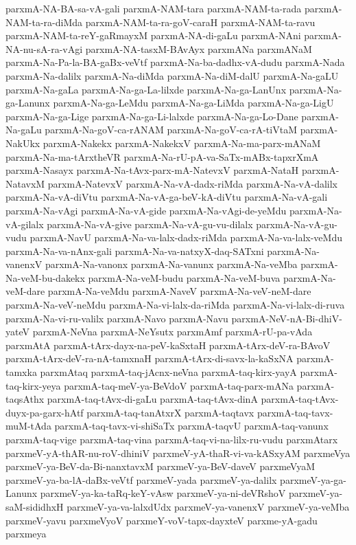{parxmA-NA-BA-sa-vA-gali
parxmA-NAM-tara
parxmA-NAM-ta-rada
parxmA-NAM-ta-ra-diMda
parxmA-NAM-ta-ra-goV-caraH
parxmA-NAM-ta-ravu
parxmA-NAM-ta-reY-gaRmayxM
parxmA-NA-di-gaLu
parxmA-NAni
parxmA-NA-nu-sA-ra-vAgi
parxmA-NA-tasxM-BAvAyx
parxmANa
parxmANaM
parxmA-Na-Pa-la-BA-gaBx-veVtf
parxmA-Na-ba-dadhx-vA-dudu
parxmA-Nada
parxmA-Na-dalilx
parxmA-Na-diMda
parxmA-Na-diM-dalU
parxmA-Na-gaLU
parxmA-Na-gaLa
parxmA-Na-ga-La-lilxde
parxmA-Na-ga-LanUnx
parxmA-Na-ga-Lanunx
parxmA-Na-ga-LeMdu
parxmA-Na-ga-LiMda
parxmA-Na-ga-LigU
parxmA-Na-ga-Lige
parxmA-Na-ga-Li-lalxde
parxmA-Na-ga-Lo-Dane
parxmA-Na-gaLu
parxmA-Na-goV-ca-rANAM
parxmA-Na-goV-ca-rA-tiVtaM
parxmA-NakUkx
parxmA-Nakekx
parxmA-NakekxV
parxmA-Na-ma-parx-mANaM
parxmA-Na-ma-tArxtheVR
parxmA-Na-rU-pA-va-SaTx-mABx-tapxrXmA
parxmA-Nasayx
parxmA-Na-tAvx-parx-mA-NatevxV
parxmA-NataH
parxmA-NatavxM
parxmA-NatevxV
parxmA-Na-vA-dadx-riMda
parxmA-Na-vA-dalilx
parxmA-Na-vA-diVtu
parxmA-Na-vA-ga-beV-kA-diVtu
parxmA-Na-vA-gali
parxmA-Na-vAgi
parxmA-Na-vA-gide
parxmA-Na-vAgi-de-yeMdu
parxmA-Na-vA-gilalx
parxmA-Na-vA-give
parxmA-Na-vA-gu-vu-dilalx
parxmA-Na-vA-gu-vudu
parxmA-NavU
parxmA-Na-va-lalx-dadx-riMda
parxmA-Na-va-lalx-veMdu
parxmA-Na-va-nAnx-gali
parxmA-Na-va-natxyX-daq-SATxni
parxmA-Na-vanenxV
parxmA-Na-vanonx
parxmA-Na-vanunx
parxmA-Na-veMba
parxmA-Na-veM-bu-dakekx
parxmA-Na-veM-budu
parxmA-Na-veM-buva
parxmA-Na-veM-dare
parxmA-Na-veMdu
parxmA-NaveV
parxmA-Na-veV-neM-dare
parxmA-Na-veV-neMdu
parxmA-Na-vi-lalx-da-riMda
parxmA-Na-vi-lalx-di-ruva
parxmA-Na-vi-ru-valilx
parxmA-Navo
parxmA-Navu
parxmA-NeV-nA-Bi-dhiV-yateV
parxmA-NeVna
parxmA-NeYsutx
parxmAmf
parxmA-rU-pa-vAda
parxmAtA
parxmA-tArx-dayx-na-peV-kaSxtaH
parxmA-tArx-deV-ra-BAvoV
parxmA-tArx-deV-ra-nA-tamxnaH
parxmA-tArx-di-savx-la-kaSxNA
parxmA-tamxka
parxmAtaq
parxmA-taq-jAcnx-neVna
parxmA-taq-kirx-yayA
parxmA-taq-kirx-yeya
parxmA-taq-meV-ya-BeVdoV
parxmA-taq-parx-mANa
parxmA-taqsAthx
parxmA-taq-tAvx-di-gaLu
parxmA-taq-tAvx-dinA
parxmA-taq-tAvx-duyx-pa-garx-hAtf
parxmA-taq-tanAtxrX
parxmA-taqtavx
parxmA-taq-tavx-muM-tAda
parxmA-taq-tavx-vi-shiSaTx
parxmA-taqvU
parxmA-taq-vanunx
parxmA-taq-vige
parxmA-taq-vina
parxmA-taq-vi-na-lilx-ru-vudu
parxmAtarx
parxmeV-yA-thAR-nu-roV-dhiniV
parxmeV-yA-thaR-vi-va-kASxyAM
parxmeVya
parxmeV-ya-BeV-da-Bi-nanxtavxM
parxmeV-ya-BeV-daveV
parxmeVyaM
parxmeV-ya-ba-lA-daBx-veVtf
parxmeV-yada
parxmeV-ya-dalilx
parxmeV-ya-ga-Lanunx
parxmeV-ya-ka-taRq-keY-vAsw
parxmeV-ya-ni-deVRshoV
parxmeV-ya-saM-sididhxH
parxmeV-ya-va-lalxdUdx
parxmeV-ya-vanenxV
parxmeV-ya-veMba
parxmeV-yavu
parxmeVyoV
parxmeY-voV-tapx-dayxteV
parxme-yA-gadu
parxmeya
}

